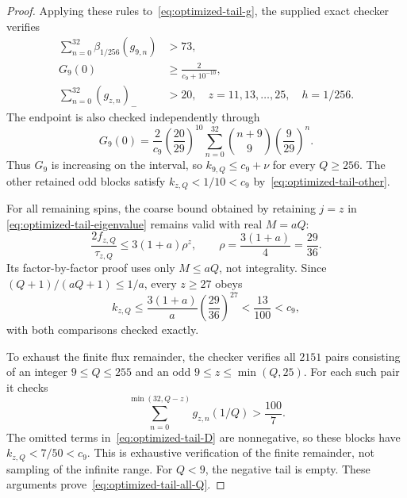 \begin{proof}
Applying these rules to~\eqref{eq:optimized-tail-g}, the supplied exact
checker verifies
\begin{align}
 \sum_{n=0}^{32}\beta_{1/256}(g_{9,n})&>73,
       \label{eq:optimized-tail-derivative}\\
 G_9(0)&\ge\frac2{c_9+10^{-10}},\label{eq:optimized-tail-endpoint}\\
 \sum_{n=0}^{32}(g_{z,n})_-&>20,
 \quad z=11,13,\ldots,25,\quad h=1/256.
 \label{eq:optimized-tail-other}
\end{align}
The endpoint is also checked independently through
\begin{equation}
 G_9(0)=\frac2{c_9}\left(\frac{20}{29}\right)^{10}
         \sum_{n=0}^{32}\binom{n+9}{9}\left(\frac9{29}\right)^n.
\end{equation}
Thus $G_9$ is increasing on the interval, so
$k_{9,Q}\le c_9+\nu$ for every $Q\ge256$. The other retained odd blocks
satisfy $k_{z,Q}<1/10<c_9$ by~\eqref{eq:optimized-tail-other}.

For all remaining spins, the coarse bound obtained by retaining $j=z$ in
\eqref{eq:optimized-tail-eigenvalue} remains valid with real $M=aQ$:
\begin{equation}
 \frac{2f_{z,Q}}{\tau_{z,Q}}\le3(1+a)\rho^z,
 \qquad\rho=\frac{3(1+a)}4=\frac{29}{36}.
\end{equation}
Its factor-by-factor proof uses only $M\le aQ$, not integrality. Since
$(Q+1)/(aQ+1)\le1/a$, every $z\ge27$ obeys
\begin{equation}\label{eq:optimized-tail-high}
 k_{z,Q}\le\frac{3(1+a)}a\left(\frac{29}{36}\right)^{27}
              <\frac{13}{100}<c_9,
\end{equation}
with both comparisons checked exactly.

To exhaust the finite flux remainder, the checker verifies all $2151$
pairs consisting of an integer $9\le Q\le255$ and an odd
$9\le z\le\min(Q,25)$. For each such pair it checks
\begin{equation}
 \sum_{n=0}^{\min(32,Q-z)}g_{z,n}(1/Q)>\frac{100}{7}.
\end{equation}
The omitted terms in~\eqref{eq:optimized-tail-D} are nonnegative, so these
blocks have $k_{z,Q}<7/50<c_9$. This is exhaustive verification of the finite
remainder, not sampling of the infinite range. For $Q<9$, the negative tail
is empty. These arguments prove~\eqref{eq:optimized-tail-all-Q}.


\end{proof}
